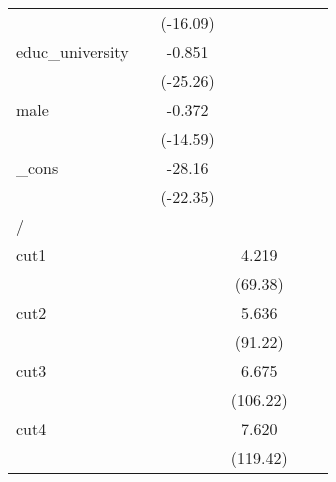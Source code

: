 {\begin{tabular}{l*{5}{c}}
            &                     &    (-16.09)         &                     &                     &                     \\
[1em]
educ\_university&                     &      -0.851\sym{***}&                     &                     &                     \\
            &                     &    (-25.26)         &                     &                     &                     \\
[1em]
male        &                     &      -0.372\sym{***}&                     &                     &                     \\
            &                     &    (-14.59)         &                     &                     &                     \\
[1em]
\_cons      &                     &      -28.16\sym{***}&                     &                     &                     \\
            &                     &    (-22.35)         &                     &                     &                     \\
\hline
/           &                     &                     &                     &                     &                     \\
cut1        &                     &                     &       4.219\sym{***}&                     &                     \\
            &                     &                     &     (69.38)         &                     &                     \\
[1em]
cut2        &                     &                     &       5.636\sym{***}&                     &                     \\
            &                     &                     &     (91.22)         &                     &                     \\
[1em]
cut3        &                     &                     &       6.675\sym{***}&                     &                     \\
            &                     &                     &    (106.22)         &                     &                     \\
[1em]
cut4        &                     &                     &       7.620\sym{***}&                     &                     \\
            &                     &                     &    (119.42)         &                     &                     \\

\end{tabular}}
